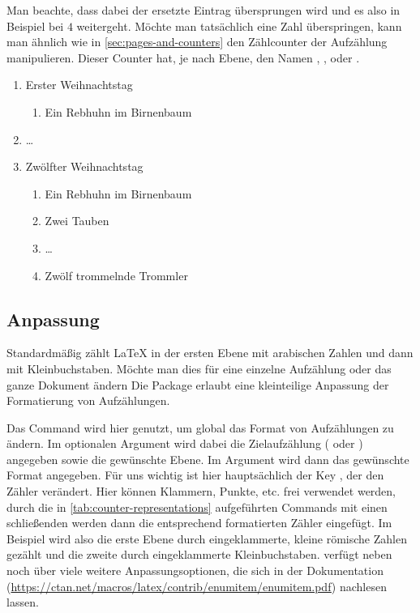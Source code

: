Man beachte, dass dabei der ersetzte Eintrag übersprungen wird und es also in Beispiel bei $4$ weitergeht.
Möchte man tatsächlich eine Zahl überspringen, kann man ähnlich wie in \autoref{sec:pages-and-counters} den Zählcounter der Aufzählung manipulieren.
Dieser Counter hat, je nach Ebene, den Namen , ,  oder .
\begin{latexlisting}
	\begin{enumerate}
		\item Erster Weihnachtstag
		\begin{enumerate}
			\item Ein Rebhuhn im Birnenbaum
		\end{enumerate}
		\item \dots
		\addtocounter{enumi}{9}
		\item Zwölfter Weihnachtstag
		\begin{enumerate}
			\item Ein Rebhuhn im Birnenbaum
			\item Zwei Tauben
			\item \dots
			\addtocounter{enumii}{8}
			\item Zwölf trommelnde Trommler
		\end{enumerate}
	\end{enumerate}
\end{latexlisting}

\subsection{Anpassung}
Standardmäßig zählt \LaTeX{} in der ersten Ebene mit arabischen Zahlen und dann mit Kleinbuchstaben.
Möchte man dies für eine einzelne Aufzählung oder das ganze Dokument ändern
Die Package  erlaubt eine kleinteilige Anpassung der Formatierung von Aufzählungen.
\begin{latexlisting}
	\usepackage{enumitem}
\end{latexlisting}
Das Command  wird hier genutzt, um global das Format von Aufzählungen zu ändern.
Im optionalen Argument wird dabei die Zielaufzählung ( oder ) angegeben sowie die gewünschte Ebene.
Im Argument wird dann das gewünschte Format angegeben.
Für uns wichtig ist hier hauptsächlich der Key , der den Zähler verändert.
Hier können Klammern, Punkte, etc. frei verwendet werden, durch die in \autoref{tab:counter-representations} aufgeführten Commands mit einen schließenden \latexargument{*} werden dann die entsprechend formatierten Zähler eingefügt.
Im Beispiel wird also die erste Ebene durch eingeklammerte, kleine römische Zahlen gezählt und die zweite durch eingeklammerte Kleinbuchstaben.
 verfügt neben  noch über viele weitere Anpassungsoptionen, die sich in der Dokumentation (\url{https://ctan.net/macros/latex/contrib/enumitem/enumitem.pdf}) nachlesen lassen.

